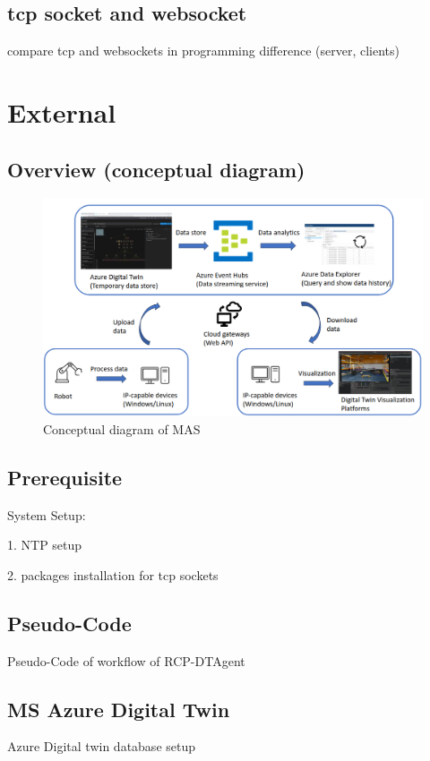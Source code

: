 \subsection{tcp socket and websocket}
compare tcp and websockets in programming difference (server, clients)


\section{External}
\subsection{Overview (conceptual diagram)}

\begin{figure}[htb]
\includegraphics[width=16cm]{figures/DT_Conceptual_Diagram.png}
\centering
\caption{Conceptual diagram of MAS\label{fig: DTConceptual}}
\end{figure}



\subsection{Prerequisite}
System Setup: 


1. NTP setup


2. packages installation for tcp sockets


\subsection{Pseudo-Code}
Pseudo-Code of workflow of RCP-DTAgent

\subsection{MS Azure Digital Twin}
Azure Digital twin database setup